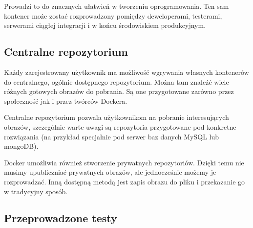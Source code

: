 \par{Prowadzi to do znacznych ułatwień w tworzeniu oprogramowania. Ten sam kontener może zostać rozprowadzony pomiędzy deweloperami, testerami, serwerami ciągłej integracji i w końcu środowiskiem produkcyjnym. }

\subsection[Centralne repozytorium]{Centralne repozytorium}

\par{Każdy zarejestrowany użytkownik ma możliwość wgrywania własnych kontenerów do centralnego, ogólnie dostępnego repozytorium. Można tam znaleźć wiele różnych gotowych obrazów do pobrania. Są one przygotowane zarówno przez społeczność jak i przez twórców Dockera. }

\par{Centralne repozytorium pozwala użytkownikom na pobranie interesujących obrazów, szczególnie warte uwagi są repozytoria przygotowane pod konkretne rozwiązania (na przykład specjalnie pod serwer baz danych MySQL lub mongoDB). }

\par{Docker umożliwia również stworzenie prywatnych repozytoriów. Dzięki temu nie musimy upubliczniać prywatnych obrazów, ale jednocześnie możemy je rozprowadzać. Inną dostępną metodą jest zapis obrazu do pliku i przekazanie go w tradycyjny sposób. }

\subsection[Przeprowadzone testy]{Przeprowadzone testy}

